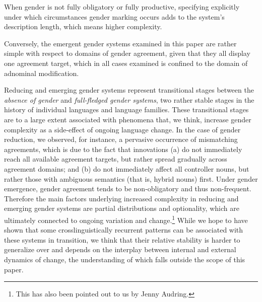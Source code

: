 \documentclass[output=collectionpaper]{langsci/langscibook}
\begin{document}
When gender is not fully obligatory or fully productive, specifying explicitly under which circumstances gender marking occurs adds to the system's description length, which means higher complexity.

Conversely, the emergent gender systems examined in this paper are rather simple with respect to domains of gender agreement, given that they all display one agreement target, which in all cases examined is confined to the domain of adnominal modification.

Reducing and emerging gender systems represent transitional stages between the \textit{absence of gender} and \textit{full-fledged gender systems}, two rather stable stages in the history of individual languages and language families. These transitional stages are to a large extent associated with phenomena that, we think, increase gender complexity as a side-effect of ongoing language change. In the case of gender reduction, we observed, for instance, a pervasive occurrence of mismatching agreements, which is due to the fact that innovations (a) do not immediately reach all available agreement targets, but rather spread gradually across agreement domains; and (b) do not immediately affect all controller nouns, but rather those with ambiguous semantics (that is, hybrid nouns) first. Under gender emergence, gender agreement tends to be non-obligatory and thus non-frequent. Therefore the main factors underlying increased complexity in reducing and emerging gender systems are partial distributions and optionality, which are ultimately connected to ongoing variation and change.\footnote{This has also been pointed out to us by Jenny Audring.} While we hope to have shown that some crosslinguistically recurrent patterns can be associated with these systems in transition, we think that their relative stability is harder to generalize over and depends on the interplay between internal and external dynamics of change, the understanding of which falls outside the scope of this paper.


\end{document}
